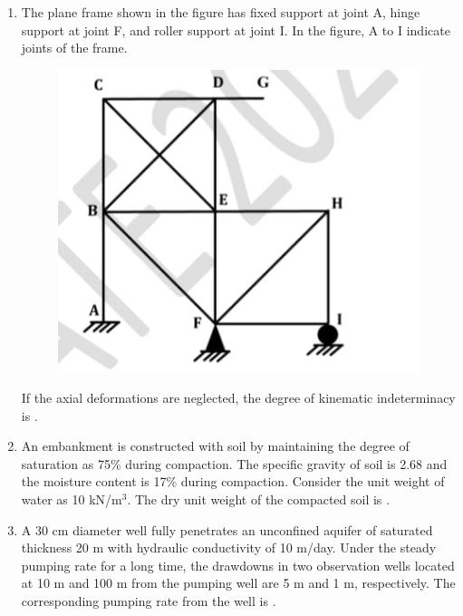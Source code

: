 \documentclass[journal,12pt,onecolumn]{article}
\theoremstyle{remark}
\begin{document}
\begin{enumerate}
    \item The plane frame shown in the figure  has fixed support at joint A, hinge support at joint F, and roller support at joint I. In the figure, A to I indicate joints of the frame.
    \begin{figure}[H]
        \centering
        \includegraphics[width=0.7\columnwidth]{figs/1Q33.jpg}
        \caption{}
        \label{fig:q33}
    \end{figure}
    If the axial deformations are neglected, the degree of kinematic indeterminacy is \underline{\hspace{2cm}} .
    
    \hfill{}

    \item An embankment is constructed with soil by maintaining the degree of saturation as 75\% during compaction. The specific gravity of soil is 2.68 and the moisture content is 17\% during compaction. Consider the unit weight of water as 10 kN/m$^3$. The dry unit weight  of the compacted soil is \underline{\hspace{2cm}} .
    
    \hfill{}

    \item A 30 cm diameter well fully penetrates an unconfined aquifer of saturated thickness 20 m with hydraulic conductivity of 10 m/day. Under the steady pumping rate for a long time, the drawdowns in two observation wells located at 10 m and 100 m from the pumping well are 5 m and 1 m, respectively. The corresponding pumping rate  from the well is \underline{\hspace{2cm}} .
    

\end{enumerate}
\end{document}
